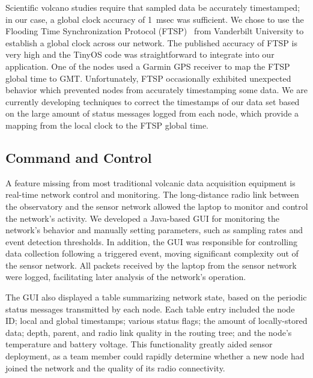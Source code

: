 Scientific volcano studies require that sampled data be accurately
timestamped; in our case, a global clock accuracy of 1~msec was sufficient.
We chose to use the Flooding Time Synchronization Protocol (FTSP)~\cite{ftsp}
from Vanderbilt University to establish a global clock across our network.
The published accuracy of FTSP is very high and the TinyOS code was
straightforward to integrate into our application. One of the nodes used a
Garmin GPS receiver to map the FTSP global time to GMT.  Unfortunately, FTSP
occasionally exhibited unexpected behavior which prevented nodes from
accurately timestamping some data. We are currently developing techniques to
correct the timestamps of our data set based on the large amount of status
messages logged from each node, which provide a mapping from the local clock
to the FTSP global time.

\subsection{Command and Control}

A feature missing from most traditional volcanic data acquisition equipment
is real-time network control and monitoring. The long-distance radio link
between the observatory and the sensor network allowed the laptop to monitor
and control the network's activity. We developed a Java-based GUI for
monitoring the network's behavior and manually setting parameters, such as
sampling rates and event detection thresholds.  In addition, the GUI was
responsible for controlling data collection following a triggered event,
moving significant complexity out of the sensor network.  All packets
received by the laptop from the sensor network were logged, facilitating
later analysis of the network's operation.

The GUI also displayed a table summarizing network state, based on the
periodic status messages transmitted by each node.  Each table entry included
the node ID; local and global timestamps; various status flags; the amount of
locally-stored data; depth, parent, and radio link quality in the routing
tree; and the node's temperature and battery voltage.  This functionality
greatly aided sensor deployment, as a team member could rapidly determine
whether a new node had joined the network and the quality of its radio
connectivity.

